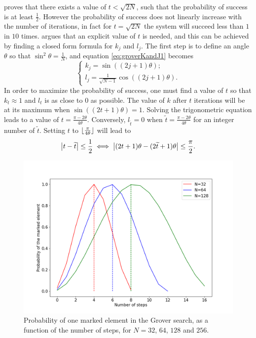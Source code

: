 \documentclass[../../dissertation.tex]{subfiles}
\begin{document}
\cite{grover1996} proves that there exists a value of $t < \sqrt{2N}$, such that
the probability of success is at least $\frac{1}{2}$. However the probability
of success does not linearly increase with the number of iterations, in fact
for $t=\sqrt{2N}$ the system will succeed less than $1$ in $10$ times.
\cite{boyer1996} argues that an explicit value of $t$ is needed, and this can be
achieved by finding a closed form formula for $k_j$ and $l_j$. The first step
is to define an angle $\theta$ so that $\sin^2\theta = \frac{1}{N}$, and
equation \eqref{eq:groverKandJ1} becomes
\begin{equation}
	\begin{cases}
		k_{j} = \sin{((2j+1)\theta)};
		\\l_{j} = \frac{1}{\sqrt{N-1}}\cos{((2j+1)\theta)}.
	\end{cases}\label{eq:groverKandJ3}
\end{equation}
In order to maximize the probability of success, one must find a value of $t$
so that $k_t \approx 1$ and $l_t$ is as close to $0$ as possible. The value of $k$
after $t$ iterations will be at its maximum when $\sin{((2t+1)\theta)} =
1$. Solving the trigonometric equation leads to a value of $t =
\frac{\pi-2\theta}{4\theta}$. Conversely, $l_{\widetilde{t}} = 0$ when
$\widetilde{t} = \frac{\pi-2\theta}{4\theta}$ for an integer number of
$\widetilde{t}$. Setting $t$ to
$\lfloor\frac{\pi}{4\theta}\rfloor$ will lead to
\begin{equation}
	\abs{t-\widetilde{t}} \leq \frac{1}{2} \iff \abs{(2t+1)\theta - (2\widetilde{t}+1)\theta} \leq \frac{\pi}{2}.
\end{equation}
\begin{figure}[!h]
	\centering
	\includegraphics[scale=0.40]{img/Grover/GroverOneMarked3264128_corrected.png}
	\caption{Probability of one marked element in the Grover search, as a function of the number of steps, for $N=32$, $64$, $128$ and $256$.} 
	\label{fig:groverOneMarked163264128}
\end{figure}
\end{document}
